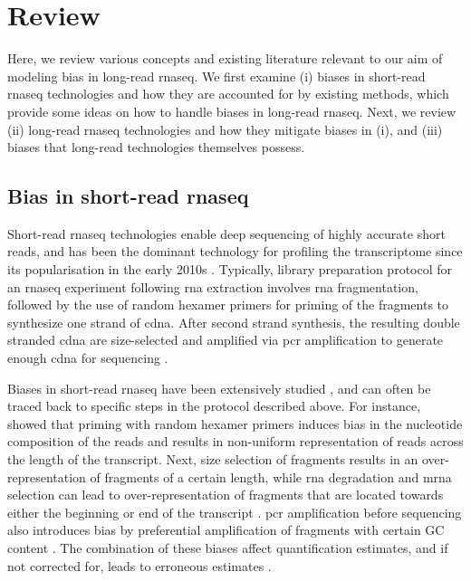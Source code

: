 \section{Review}

Here, we review various concepts and existing literature relevant to our aim of modeling bias in long-read \gls{rnaseq}. We first examine (i) biases in short-read \gls{rnaseq} technologies and how they are accounted for by existing methods, which provide some ideas on how to handle biases in long-read \gls{rnaseq}. Next, we review (ii) long-read \gls{rnaseq} technologies and how they mitigate biases in (i), and (iii) biases that long-read technologies themselves possess. 

\subsection{Bias in short-read \gls{rnaseq}}

Short-read \gls{rnaseq} technologies enable deep sequencing of highly accurate short reads, and has been the dominant technology for profiling the transcriptome since its popularisation in the early 2010s \cite{Lowe2017}. Typically, library preparation protocol for an \gls{rnaseq} experiment following \gls{rna} extraction involves \gls{rna} fragmentation, followed by the use of random hexamer primers for priming of the fragments to synthesize one strand of \gls{cdna}. After second strand synthesis, the resulting double stranded \gls{cdna} are size-selected and amplified via \gls{pcr} amplification to generate enough \gls{cdna} for sequencing \cite{Marguerat2010}.  

Biases in short-read \gls{rnaseq} have been extensively studied \cite{Hansen2010, Li2010, Li2011, Zhengpeng2010, Roberts2011, Benjamini2012, Lahens2014, Love2016}, and can often be traced back to specific steps in the protocol described above. For instance, \cite{Hansen2010} showed that priming with random hexamer primers induces bias in the nucleotide composition of the reads and results in non-uniform representation of reads across the length of the transcript. Next, size selection of fragments results in an over-representation of fragments of a certain length, while \gls{rna} degradation and \gls{mrna} selection can lead to over-representation of fragments that are located towards either the beginning or end of the transcript \cite{Roberts2011, Lahens2014, Love2016}. \gls{pcr} amplification before sequencing also introduces bias by preferential amplification of fragments with certain GC content \cite{Benjamini2012, Love2016}. The combination of these biases affect quantification estimates, and if not corrected for, leads to erroneous estimates \cite{Roberts2011, Love2016}. 

